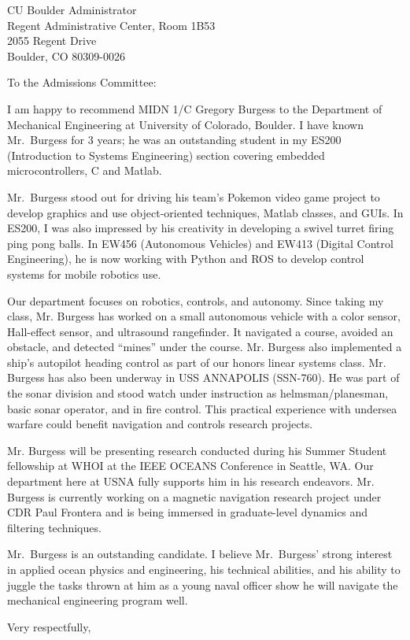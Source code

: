 \documentclass[11pt]{wrceletter}
\date{\today}
\begin{document}
\begin{letter}{%
CU Boulder Administrator\\
Regent Administrative Center, Room 1B53\\
2055 Regent Drive\\
Boulder, CO 80309-0026}

\opening{To the Admissions Committee:}
\raggedright %
\setlength{\parindent}{15pt} %

I am happy to recommend MIDN 1/C Gregory Burgess to the Department of Mechanical Engineering at University of Colorado, Boulder. I have known Mr.~Burgess for 3 years; he was an outstanding student in my ES200 (Introduction to Systems Engineering) section covering embedded microcontrollers, C and Matlab. 

Mr.~Burgess stood out for driving his team's Pokemon video game project to develop graphics and use object-oriented techniques, Matlab classes, and GUIs. In ES200, I was also impressed by his creativity in developing a swivel turret firing ping pong balls. In EW456 (Autonomous Vehicles) and EW413 (Digital Control Engineering), he is now working with Python and ROS to develop control systems for mobile robotics use.

Our department focuses on robotics, controls, and autonomy. Since taking my class, Mr. Burgess has worked on a small autonomous vehicle with a color sensor, Hall-effect sensor, and ultrasound rangefinder. It navigated a course, avoided an obstacle, and detected ``mines'' under the course. Mr. Burgess also implemented a ship’s autopilot heading control as part of our honors linear systems class. Mr. Burgess has also been underway in USS ANNAPOLIS (SSN-760). He was part of the sonar division and stood watch under instruction as helmsman/planesman, basic sonar operator, and in fire control. This practical experience with undersea warfare could benefit navigation and controls research projects.

Mr. Burgess will be presenting research conducted during his Summer Student fellowship at WHOI at the IEEE OCEANS Conference in Seattle, WA. Our department here at USNA fully supports him in his research endeavors. Mr. Burgess is currently working on a magnetic navigation research project under CDR Paul Frontera and is being immersed in graduate-level dynamics and filtering techniques. 

Mr.~Burgess is an outstanding candidate. I believe Mr.~Burgess' strong interest in applied ocean physics and engineering, his technical abilities, and his ability to juggle the tasks thrown at him as a young naval officer show he will navigate the mechanical engineering program well. 

\closing{Very respectfully,} %

\end{letter}
\end{document}
